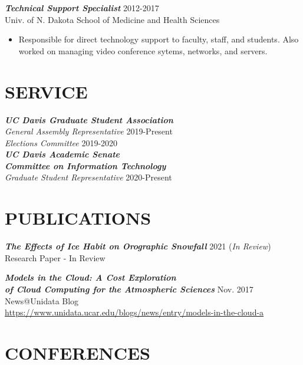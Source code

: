 \documentclass[margin]{res}
\begin{document}
\begin{resume}
\begin{itemize}
                \end{itemize}

                {\sl \textbf{Technical Support Specialist}} \hfill 2012-2017 \\
                Univ. of N. Dakota School of Medicine and Health Sciences \\
                \begin{itemize} \itemsep -2pt
                    \item Responsible  for  direct  technology  support  to  faculty,  staff,  and  students.  Also  worked  on managing video conference sytems, networks, and servers.

                \end{itemize}
\pagebreak
\section{SERVICE}
                {\sl \textbf{UC Davis Graduate Student Association}} \\
                {\sl General Assembly Representative} \hfill 2019-Present \\
                {\sl Elections Committee} \hfill 2019-2020 \\

                {\sl \textbf{UC Davis Academic Senate \\ Committee on Information Technology}} \\
                {\sl  Graduate Student Representative} \hfill 2020-Present


\section{PUBLICATIONS}
                {\sl \textbf{The Effects of Ice Habit on Orographic Snowfall}} \hfill 2021 (\textit{In Review}) \\
                Research Paper - In Review 

                
                {\sl \textbf{Models in the Cloud: A Cost Exploration \\ of Cloud Computing for the Atmospheric Sciences}} \hfill Nov. 2017 \\
                News@Unidata Blog \\
                \href{https://www.unidata.ucar.edu/blogs/news/entry/models-in-the-cloud-a}{https://www.unidata.ucar.edu/blogs/news/entry/models-in-the-cloud-a}


\section{CONFERENCES}


\end{resume}
\end{document}
